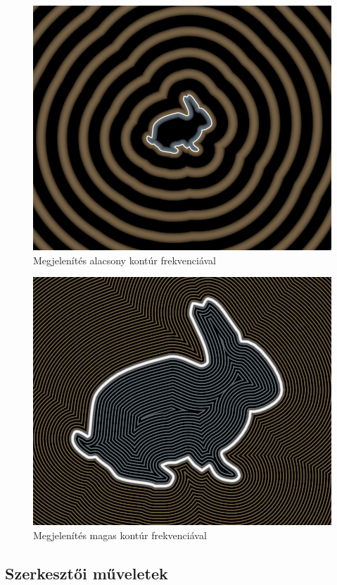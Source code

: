 \begin{figure}[H]
    \centering
    \includegraphics[width=0.85\linewidth]{images/low_contour_frequency.png}
    \caption{Megjelenítés alacsony kontúr frekvenciával}
    \label{fig:low_contour_frequency-1}
\end{figure}

\begin{figure}[H]
    \centering
    \includegraphics[width=0.85\linewidth]{images/high_contour_frequency.png}
    \caption{Megjelenítés magas kontúr frekvenciával}
    \label{fig:high_contour_frequency-1}
\end{figure}

\subsection{Szerkesztői műveletek}

